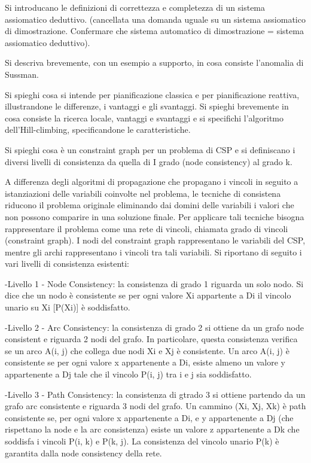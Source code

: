 \documentclass[answers, a4paper, 11pt]{exam}
\begin{document}
\begin{questions}
\question Si introducano le definizioni di correttezza e completezza di un sistema assiomatico deduttivo. (cancellata una domanda uguale su un sistema assiomatico di dimostrazione. Confermare che
sistema automatico di dimostrazione = sistema assiomatico deduttivo).

\question Si descriva brevemente, con un esempio a supporto, in cosa consiste l’anomalia di Sussman.

\question Si spieghi cosa si intende per pianificazione classica e per pianificazione reattiva, illustrandone le
differenze, i vantaggi e gli svantaggi.
\question Si spieghi brevemente in cosa consiste la ricerca locale, vantaggi e svantaggi e si specifichi
l’algoritmo dell’Hill-climbing, specificandone le caratteristiche.

\question Si spieghi cosa è un constraint graph per un problema di CSP e si definiscano i diversi livelli di
consistenza da quella di I grado (node consistency) al grado k.
\begin{solution}
  A differenza degli algoritmi di propagazione che propagano i vincoli in seguito a istanziazioni delle variabili coinvolte nel problema, le tecniche di consistena riducono il problema originale eliminando dai domini delle variabili i valori che non possono comparire in una soluzione finale.
  Per applicare tali tecniche bisogna rappresentare il problema come una rete di vincoli, chiamata grado di vincoli (constraint graph). I nodi del constraint graph rappresentano le variabili del CSP, mentre gli archi rappresentano i vincoli tra tali variabili.
  Si riportano di seguito i vari livelli di consistenza esistenti:

  -Livello 1 - Node Consistency: la consistenza di grado 1 riguarda un solo nodo. Si dice che un nodo è consistente se per ogni valore Xi appartente a Di il vincolo unario su Xi [P(Xi)] è soddisfatto.

  -Livello 2 - Arc Consistency: la consistenza di grado 2 si ottiene da un grafo node consistent e riguarda 2 nodi del grafo. In particolare, questa consistenza verifica se un arco A(i, j) che collega due nodi Xi e Xj è consistente.
  Un arco A(i, j) è consistente se per ogni valore x appartenente a Di, esiste almeno un valore y appartenente a Dj tale che il vincolo P(i, j) tra i e j sia soddisfatto.

  -Livello 3 - Path Consistency: la consistenza di gtrado 3 si ottiene partendo da un grafo arc consistente e riguarda 3 nodi del grafo. Un cammino (Xi, Xj, Xk) è path consistente se, per ogni valore x appartenente a Di, e y appartenente a Dj (che rispettano la node e la arc consistenza) esiste un valore z appartenente a Dk che soddisfa i vincoli P(i, k) e P(k, j).
  La consistenza del vincolo unario P(k) è garantita dalla node consistency della rete.


\end{solution}
\end{questions}
\end{document}
